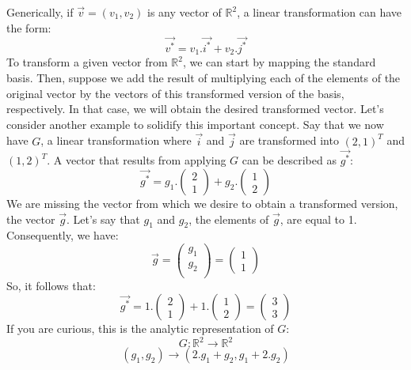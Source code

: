 \documentclass[600paper, 11pt,twoside,openany]{kdp}
\begin{document}
 Generically, if $\overrightarrow{v}=(v_1,v_2)$ is any vector of $\mathbb{R}^2$, a linear transformation can have the form:
\[ \overrightarrow{v^*} = v_1.\overrightarrow{i^*} + v_2.\overrightarrow{j^*} \]
\indent To transform a given vector from $\mathbb{R}^2$, we can start by mapping the standard basis. Then, suppose we add the result of multiplying each of the elements of the original vector by the vectors of this transformed version of the basis, respectively. In that case, we will obtain the desired transformed vector. Let’s consider another example to solidify this important concept. Say that we now have $G$, a linear transformation where $\overrightarrow{i}$ and $\overrightarrow{j}$ are transformed into $(2,1)^T$ and $(1,2)^T$. A vector that results from applying $G$ can be described as $\overrightarrow{g^*}$:
\begin{equation}\label{eq:transfG}
\overrightarrow{g^*} = g_1.\begin{pmatrix}
 2\\
 1
 \end{pmatrix} + g_2.\begin{pmatrix}
 1\\
 2
 \end{pmatrix}
\end{equation}
\indent We are missing the vector from which we desire to obtain a transformed version, the vector $\overrightarrow{g}$. Let’s say that $g_1$ and $g_2$, the elements of $\overrightarrow{g}$, are equal to 1. Consequently, we have:
\[ \overrightarrow{g} = \begin{pmatrix}
 g_1\\
 g_2\\
 \end{pmatrix} = \begin{pmatrix}
 1\\
 1
 \end{pmatrix}\]
\indent So, it follows that:
\[ \overrightarrow{g^*} = 1.\begin{pmatrix}
 2\\
 1
 \end{pmatrix} + 1.\begin{pmatrix}
 1\\
 2
 \end{pmatrix} = \begin{pmatrix}
 3\\
 3
 \end{pmatrix} \]
 \indent  If you are curious, this is the analytic representation of $G$:
\[G:\mathbb{R}^2 \rightarrow \mathbb{R}^2 \]
\[(g_1,g_2) \rightarrow (2.g_1 + g_2, g_1 + 2.g_2) \]
\end{document}
